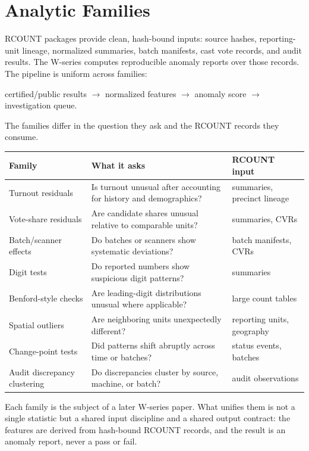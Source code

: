 \section{Analytic Families}

RCOUNT packages provide clean, hash-bound inputs: source hashes, reporting-unit
lineage, normalized summaries, batch manifests, cast vote records, and audit
results. The W-series computes reproducible anomaly reports over those records.
The pipeline is uniform across families:

\begin{center}
certified/public results $\rightarrow$ normalized features $\rightarrow$
anomaly score $\rightarrow$ investigation queue.
\end{center}

The families differ in the question they ask and the RCOUNT records they
consume.

\begin{center}
\small
\begin{tabularx}{\textwidth}{lXl}
\toprule
Family & What it asks & RCOUNT input \\
\midrule
Turnout residuals & Is turnout unusual after accounting for history and demographics? & summaries, precinct lineage \\
Vote-share residuals & Are candidate shares unusual relative to comparable units? & summaries, CVRs \\
Batch/scanner effects & Do batches or scanners show systematic deviations? & batch manifests, CVRs \\
Digit tests & Do reported numbers show suspicious digit patterns? & summaries \\
Benford-style checks & Are leading-digit distributions unusual where applicable? & large count tables \\
Spatial outliers & Are neighboring units unexpectedly different? & reporting units, geography \\
Change-point tests & Did patterns shift abruptly across time or batches? & status events, batches \\
Audit discrepancy clustering & Do discrepancies cluster by source, machine, or batch? & audit observations \\
\bottomrule
\end{tabularx}
\end{center}

Each family is the subject of a later W-series paper. What unifies them is not a
single statistic but a shared input discipline and a shared output contract: the
features are derived from hash-bound RCOUNT records, and the result is an
anomaly report, never a pass or fail.
